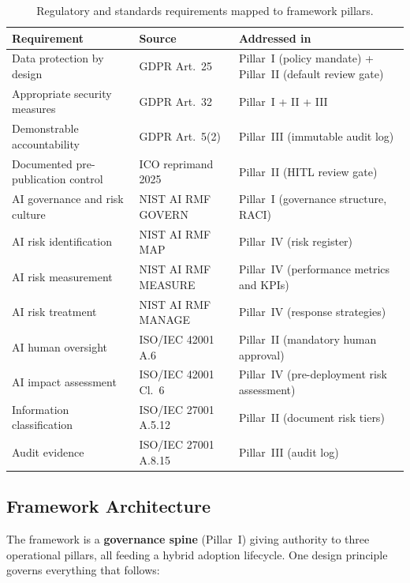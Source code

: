 \documentclass[12pt,a4paper]{article}
\begin{document}
\begin{table}[H]
\centering
\small
{}
\begin{tabular}{@{} p{4.3cm} p{3.5cm} p{5.7cm} @{}}
\toprule
\textbf{\color{accentdark}Requirement} & \textbf{\color{accentdark}Source} & \textbf{\color{accentdark}Addressed in} \\
\midrule
Data protection by design & GDPR Art.~25 & Pillar~I (policy mandate) + Pillar~II (default review gate) \\
Appropriate security measures & GDPR Art.~32 & Pillar~I + II + III \\
Demonstrable accountability & GDPR Art.~5(2) & Pillar~III (immutable audit log) \\
Documented pre-publication control & ICO reprimand 2025 & Pillar~II (HITL review gate) \\
AI governance and risk culture & NIST AI RMF GOVERN & Pillar~I (governance structure, RACI) \\
AI risk identification & NIST AI RMF MAP & Pillar~IV (risk register) \\
AI risk measurement & NIST AI RMF MEASURE & Pillar~IV (performance metrics and KPIs) \\
AI risk treatment & NIST AI RMF MANAGE & Pillar~IV (response strategies) \\
AI human oversight & ISO/IEC 42001 A.6 & Pillar~II (mandatory human approval) \\
AI impact assessment & ISO/IEC 42001 Cl.~6 & Pillar~IV (pre-deployment risk assessment) \\
Information classification & ISO/IEC 27001 A.5.12 & Pillar~II (document risk tiers) \\
Audit evidence & ISO/IEC 27001 A.8.15 & Pillar~III (audit log) \\
\bottomrule
\end{tabular}
\caption{Regulatory and standards requirements mapped to framework pillars.}
\label{tab:standards}
\end{table}

\subsection{Framework Architecture}
\label{sec:architecture}

The framework is a \textbf{governance spine} (Pillar~I) giving authority to three operational pillars, all feeding a hybrid adoption lifecycle. One design principle governs everything that follows:
\end{document}

